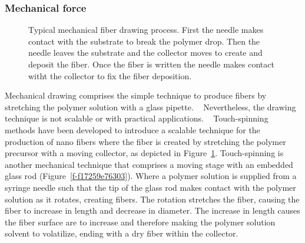 \documentclass[5p,,preprint,12pt,twocolumn]{elsarticle}
\makeatletter
\def\fixFloatSize#1{}%
\makeatother
\begin{document}
\subsubsection{Mechanical force}
\bgroup
\fixFloatSize{images/23a9bc42-4d02-4a78-a907-23aeeb2de68a-uimg_meches_process.png}
\begin{figure}[!htbp]
\centering \makeatletter{}
\makeatother 
\caption{{Typical mechanical fiber drawing process. First the needle makes contact with the substrate to break the polymer drop. Then the needle leaves the substrate and the collector moves to create and deposit the fiber. Once the fiber is written the needle makes contact witht the collector to fix the fiber deposition.}}
\label{f-432d16f420fb}
\end{figure}
\egroup
Mechanical drawing comprises the simple technique to produce fibers by stretching the polymer solution with a glass pipette. \unskip~\cite{527120:14024998} Nevertheless, the drawing technique is not scalable or with practical applications. \unskip~\cite{527120:14025041} Touch-spinning methods have been developed to introduce a scalable technique for the production of nano fibers where the fiber is created by stretching the polymer precursor with a moving collector, as depicted in Figure~\ref{f-432d16f420fb}. Touch-spinning is another mechanical technique that comprises a moving stage with an embedded glass rod (Figure~\ref{f-f17259e76303}). Where a polymer solution is supplied from a syringe needle such that the tip of the glass rod makes contact with the polymer solution as it rotates, creating fibers. The rotation stretches the fiber, causing the fiber to increase in length and decrease in diameter. The increase in length causes the fiber surface are to increase and therefore making the polymer solution solvent to volatilize, ending with a dry fiber within the collector.
\end{document}
